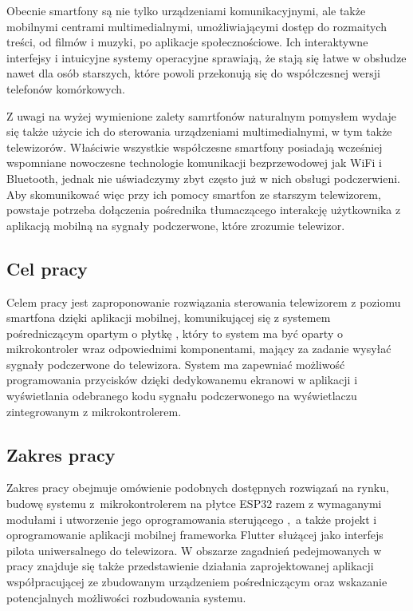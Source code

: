 \documentclass[12pt,twoside]{article}
\begin{document}
Obecnie smartfony są nie tylko urządzeniami komunikacyjnymi, ale także mobilnymi centrami multimedialnymi,
umożliwiającymi dostęp do rozmaitych treści, od filmów i muzyki, po aplikacje społecznościowe.
Ich interaktywne interfejsy i intuicyjne systemy operacyjne sprawiają, że stają się łatwe w obsłudze nawet dla osób starszych,
które powoli przekonują się do współczesnej wersji telefonów komórkowych.

Z uwagi na wyżej wymienione zalety samrtfonów naturalnym pomysłem wydaje się także użycie ich do
sterowania urządzeniami multimedialnymi, w tym także telewizorów. Właściwie wszystkie współczesne smartfony posiadają
wcześniej wspomniane nowoczesne technologie komunikacji bezprzewodowej jak WiFi i Bluetooth, jednak nie uświadczymy
zbyt często już w nich obsługi podczerwieni. Aby skomunikować więc przy ich pomocy smartfon
ze starszym telewizorem, powstaje potrzeba dołączenia pośrednika tłumaczącego interakcję
użytkownika z aplikacją mobilną na sygnały podczerwone, które zrozumie telewizor.

\subsection{Cel pracy}
Celem pracy jest zaproponowanie rozwiązania sterowania telewizorem z poziomu
smartfona dzięki aplikacji mobilnej, komunikującej się z systemem pośredniczącym opartym o płytkę , który to system ma być oparty o mikrokontroler wraz odpowiednimi komponentami, mający za zadanie wysyłać sygnały podczerwone do telewizora. System ma zapewniać możliwość programowania przycisków dzięki dedykowanemu ekranowi w aplikacji i
wyświetlania odebranego kodu sygnału podczerwonego na wyświetlaczu zintegrowanym z mikrokontrolerem.

\subsection{Zakres pracy}
Zakres pracy obejmuje omówienie podobnych dostępnych rozwiązań na rynku, budowę systemu z~mikrokontrolerem na płytce ESP32 razem z wymaganymi modułami i utworzenie jego oprogramowania sterującego ,~a także projekt i oprogramowanie aplikacji
mobilnej frameworka Flutter służącej jako interfejs pilota uniwersalnego do telewizora. W obszarze zagadnień pedejmowanych w pracy znajduje się także przedstawienie działania zaprojektowanej aplikacji współpracującej ze zbudowanym urządzeniem pośredniczącym oraz wskazanie potencjalnych możliwości rozbudowania systemu.
\end{document}

